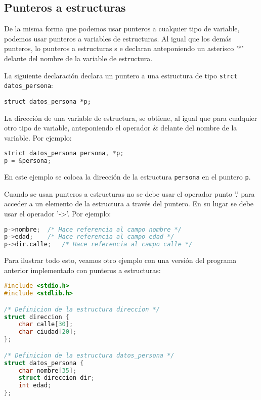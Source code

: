 \subsection{Punteros a estructuras}{
De la misma forma que podemos usar punteros a cualquier tipo de variable, podemos usar punteros a variables de estructuras. Al igual que los demás punteros, lo punteros a estructuras s e declaran anteponiendo un asterisco '*' delante del nombre de la variable de estructura.

La siguiente declaración declara un puntero a una estructura de tipo \texttt{strct datos\_persona}:

\texttt{struct datos\_persona *p;}

La dirección de una variable de estructura, se obtiene, al igual que para cualquier otro tipo de variable, anteponiendo el operador \& delante del nombre de la variable. Por ejemplo:
\begin{Ejemplo}
\begin{lstlisting}[language=C]
strict datos_persona persona, *p;
p = &persona;
\end{lstlisting}
\Explicacion
En este ejemplo se coloca la dirección de la estructura \texttt{persona} en el puntero \texttt{p}.\\
\end{Ejemplo}

Cuando se usan punteros a estructuras no se debe usar el operador punto '.' para acceder a un elemento de la estructura a través del puntero. En su lugar se debe usar el operador '->'. Por ejemplo:
\newpage
\begin{Ejemplo}
\begin{lstlisting}[language=C]
p->nombre;	/* Hace referencia al campo nombre */
p->edad;	/* Hace referencia al campo edad */
p->dir.calle;	/* Hace referencia al campo calle */
\end{lstlisting}
\end{Ejemplo}
Para ilustrar todo esto, veamos otro ejemplo con una versión del programa anterior implementado con punteros a estructuras:
\begin{Ejemplo}
\begin{lstlisting}[language=C]
#include <stdio.h>
#include <stdlib.h>

/* Definicion de la estructura direccion */
struct direccion {
    char calle[30];
    char ciudad[20];
};

/* Definicion de la estructura datos_persona */
struct datos_persona {
    char nombre[35];
    struct direccion dir;
    int edad;
};


\end{lstlisting}
\end{Ejemplo}}
